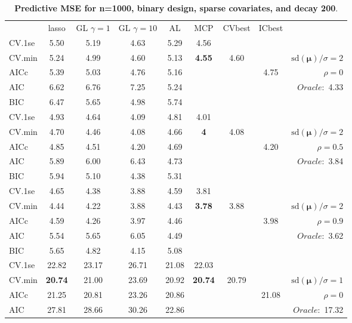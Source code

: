 \begin{table}\vspace{-.5cm}
\caption[l]{ { \bf Predictive MSE for n=1000, binary design, 
sparse covariates, and  decay  200}.}
\vspace{-.5cm}
\footnotesize{}
\begin{center}
\begin{tabular}{l*{7}{c}|r}
 & lasso & GL $\gamma=1$ & GL $\gamma=10$ & AL & MCP  & CVbest & ICbest  \\
\cline{1-9}
CV.1se & 5.50 & 5.19 & 4.63 & 5.29 & 4.56 & & & \\
CV.min & 5.24 & 4.99 & 4.60 & 5.13 & {\bf 4.55} & 4.60 & & $\mathrm{sd}(\mathbf{\mu})/\sigma=2$ \\
AICc & 5.39 & 5.03 & 4.76 & 5.16 & & & 4.75 &  $\rho=0$ \\
AIC & 6.62 & 6.76 & 7.25 & 5.24 & & & &  \multirow{2}{*}{$Oracle: $ 4.33} \\
BIC & 6.47 & 5.65 & 4.98 & 5.74 & & & &  \\
 \hline 
CV.1se & 4.93 & 4.64 & 4.09 & 4.81 & 4.01 & & & \\
CV.min & 4.70 & 4.46 & 4.08 & 4.66 & {\bf 4} & 4.08 & & $\mathrm{sd}(\mathbf{\mu})/\sigma=2$ \\
AICc & 4.85 & 4.51 & 4.20 & 4.69 & & & 4.20 &  $\rho=0.5$ \\
AIC & 5.89 & 6.00 & 6.43 & 4.73 & & & &  \multirow{2}{*}{$Oracle: $ 3.84} \\
BIC & 5.94 & 5.10 & 4.38 & 5.31 & & & &  \\
 \hline 
CV.1se & 4.65 & 4.38 & 3.88 & 4.59 & 3.81 & & & \\
CV.min & 4.44 & 4.22 & 3.88 & 4.43 & {\bf 3.78} & 3.88 & & $\mathrm{sd}(\mathbf{\mu})/\sigma=2$ \\
AICc & 4.59 & 4.26 & 3.97 & 4.46 & & & 3.98 &  $\rho=0.9$ \\
AIC & 5.54 & 5.65 & 6.05 & 4.49 & & & &  \multirow{2}{*}{$Oracle: $ 3.62} \\
BIC & 5.65 & 4.82 & 4.15 & 5.08 & & & &  \\
 \hline 
CV.1se & 22.82 & 23.17 & 26.71 & 21.08 & 22.03 & & & \\
CV.min & {\bf 20.74} & 21.00 & 23.69 & 20.92 & {\bf 20.74} & 20.79 & & $\mathrm{sd}(\mathbf{\mu})/\sigma=1$ \\
AICc & 21.25 & 20.81 & 23.26 & 20.86 & & & 21.08 &  $\rho=0$ \\
AIC & 27.81 & 28.66 & 30.26 & 22.86 & & & &  \multirow{2}{*}{$Oracle: $ 17.32} \\

\end{tabular}
\end{center}
\end{table}
